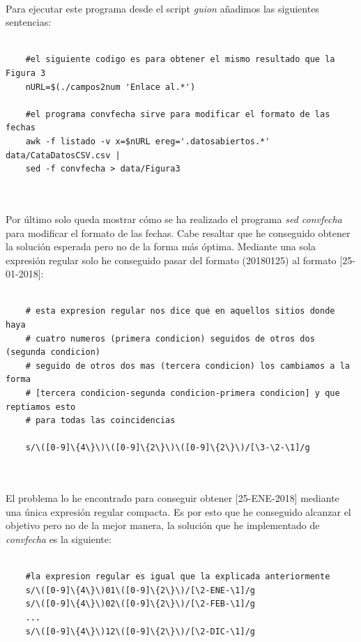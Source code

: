 \documentclass[10pt, a4paper,spanish]{article}
\begin{document}
\noindent\\ Para ejecutar este programa desde el script \textit{guion} añadimos las siguientes sentencias:
\begin{lstlisting}
    
    #el siguiente codigo es para obtener el mismo resultado que la Figura 3 
    nURL=$(./campos2num 'Enlace al.*')
    
    #el programa convfecha sirve para modificar el formato de las fechas
    awk -f listado -v x=$nURL ereg='.datosabiertos.*' data/CataDatosCSV.csv | 
    sed -f convfecha > data/Figura3
    
\end{lstlisting}

\noindent \\ Por último solo queda mostrar cómo se ha realizado el programa \textit{sed convfecha} para modificar el formato de las fechas. Cabe resaltar que he conseguido obtener la solución esperada pero no de la forma más óptima. Mediante una sola expresión regular solo he conseguido pasar del formato (20180125) al formato [25-01-2018]:

\begin{lstlisting}
    
    # esta expresion regular nos dice que en aquellos sitios donde haya 
    # cuatro numeros (primera condicion) seguidos de otros dos (segunda condicion)
    # seguido de otros dos mas (tercera condicion) los cambiamos a la forma
    # [tercera condicion-segunda condicion-primera condicion] y que reptiamos esto
    # para todas las coincidencias
    
    s/\([0-9]\{4\}\)\([0-9]\{2\}\)\([0-9]\{2\}\)/[\3-\2-\1]/g
    
\end{lstlisting}

\newpage
\noindent \\ El problema lo he encontrado para conseguir obtener [25-ENE-2018] mediante una única expresión regular compacta. Es por esto que he conseguido alcanzar el objetivo pero no de la mejor manera, la solución que he implementado de \textit{convfecha} es la siguiente:

\begin{lstlisting}
    
    #la expresion regular es igual que la explicada anteriormente
    s/\([0-9]\{4\}\)01\([0-9]\{2\}\)/[\2-ENE-\1]/g
    s/\([0-9]\{4\}\)02\([0-9]\{2\}\)/[\2-FEB-\1]/g
    ...
    s/\([0-9]\{4\}\)12\([0-9]\{2\}\)/[\2-DIC-\1]/g
    
\end{lstlisting}
\end{document}

